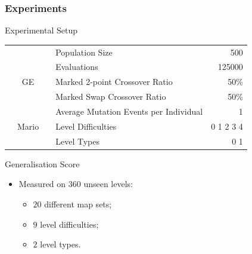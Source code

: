 \documentclass{beamer}
\begin{document}
\begin{frame}
	\frametitle{Experiments}
	\begin{block}{Experimental Setup}
		\begin{center}
		\scriptsize{\begin{tabular}{|c|l|r|}
			\hline
			&Population Size & 500\\
			&Evaluations     & 125000\\
			GE&Marked 2-point Crossover Ratio & 50\%\\
			&Marked Swap Crossover Ratio & 50\%\\
			&Average Mutation Events per Individual & 1\\
			\hline
			\ \ Mario\ \ &Level Difficulties & 0 1 2 3 4 \\
			&Level Types & 0 1 \\
			\hline
		\end{tabular}}
		\end{center}
	\end{block}
	\begin{block}{Generalisation Score}
		\begin{itemize}
			\item Measured on $360$ unseen levels:
			\begin{itemize}
				\item $20$ different map sets;
				\item $9$ level difficulties;
				\item $2$ level types.
			\end{itemize}
		\end{itemize}
	\end{block}
	\vfill
\end{frame}
\end{document}
